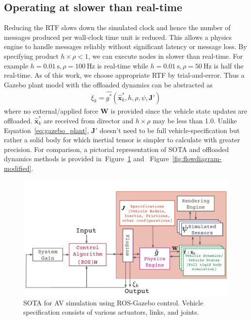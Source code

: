 \documentclass[aps,pra,twocolumn,notitlepage,nofootinbib,superscriptaddress]{revtex4-1}
\newcommand\figref{Figure~\ref}
\newcommand{\spliteq}[1]{\begin{equation}\begin{split}#1\end{split}\end{equation}}
\def\xbf{{\mathbf x}}
\def\Jbf{{\mathbf J}}
\def\Wbf{{\mathbf W}}
\begin{document}
\subsection{Operating at slower than real-time}
Reducing the RTF slows down the simulated clock and hence the number of messages produced per wall-clock time unit is reduced. This allows a physics engine to handle messages reliably without significant latency or message loss. By specifying product $h \times \rho < 1$, we can execute nodes in slower than real-time. For example $h = 0.01~\textrm{s}, \rho = 100~\textrm{Hz}$ is real-time while $h = 0.01~\textrm{s}, \rho = 50~\textrm{Hz}$ is half the real-time.  As of this work, we choose appropriate RTF by trial-and-error.  Thus a Gazebo plant model with the offloaded dynamics can be abstracted as
\spliteq{
\label{eq:gazebo-plant-offloaded}
\xi_k = \hat{g^*}(\hat{\xbf}^*_k, h, \rho, \psi, \Jbf')
}
where no external/applied force $\Wbf$ is provided since the vehicle state updates are offloaded. $\hat{\xbf}^*_k$ are received from director and $h \times \rho$ may be less than 1.0. Unlike Equation~\eqref{eq:gazebo_plant}, $\Jbf'$ doesn't need to be full vehicle-specification but rather a solid body for which inertial tensor is simpler to calculate with greater precision. For comparison, a pictorial representation of SOTA and offloaded dynamics methods is provided in~\figref{fig:flowdiagram-original} and ~\figref{fig:flowdiagram-modified}.

\begin{figure}[htpb]
\centering
\includegraphics[angle=0,origin=c,trim={0.0cm 0.0cm 0.0cm 1.8cm},clip,width=1.0\linewidth]{ros_standard_approach.pdf}
\caption{SOTA for AV simulation using ROS-Gazebo control. Vehicle specification consists of various actuators, links, and joints.}
\label{fig:flowdiagram-original}
\end{figure}
\end{document}
